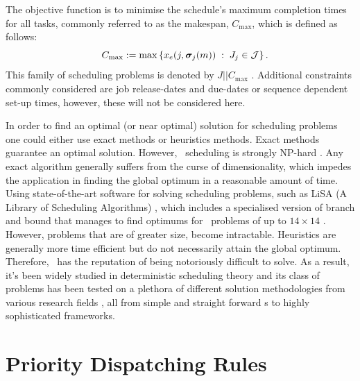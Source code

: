 \documentclass[twocolumn]{svjour3}
\begin{document}
The objective function is to minimise the schedule's maximum completion times 
for all tasks, commonly referred to as the makespan, $C_{\max}$, which is 
defined as follows:
\begin{equation}\quad
C_{\max} := 
\max\left\{x_e(j,\bm \sigma_j(m))\;:\;J_j\in\mathcal{J}\right\}.\label{eq:makespan}
\end{equation} 
This family of scheduling problems is denoted by $J||C_{\max}$ 
\cite{Pinedo08}.
Additional constraints commonly considered are job release-dates and due-dates 
or sequence dependent set-up times, however, these will not be considered here. 

In order to find an optimal (or near optimal) solution for scheduling problems 
one could either use exact methods or heuristics methods. Exact methods 
guarantee an optimal solution. However, \jsp\ scheduling is strongly NP-hard 
\cite{Garey76:NPhard}. Any exact algorithm generally suffers from the curse of 
dimensionality, which impedes the application in finding the global optimum in 
a reasonable amount of time. 
Using state-of-the-art software for solving scheduling problems, such as 
LiSA %
(A Library of Scheduling Algorithms) \cite{LiSA}, which includes a specialised 
version of branch and bound that manages to find optimums for \jsp\ problems of 
up to $14\times14$ \cite{Ru12}. However, problems that are of greater size, 
become intractable. 
Heuristics are generally more time efficient but 
do not necessarily attain the global optimum. Therefore, \jsp\ has the 
reputation of being notoriously difficult to solve. 
As a result, it's been widely studied in deterministic scheduling theory and 
its class of problems has been tested on a plethora of different solution 
methodologies from various research fields \cite{Meeran12}, all from simple and 
straight forward \dr s to highly sophisticated frameworks.

\section{Priority Dispatching Rules} \label{sec:DR}
\end{document}
